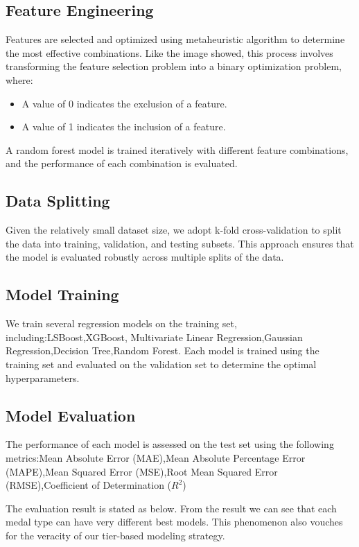 \documentclass{mcmthesis}
\begin{document}
\subsection{Feature Engineering}

Features are selected and optimized using metaheuristic algorithm to determine the most effective combinations. Like the image showed, this process involves transforming the feature selection problem into a binary optimization problem, where:
\begin{itemize}
    \item A value of 0 indicates the exclusion of a feature.
    \item A value of 1 indicates the inclusion of a feature.
\end{itemize}
A random forest model is trained iteratively with different feature combinations, and the performance of each combination is evaluated. 


\subsection{Data Splitting}

Given the relatively small dataset size, we adopt k-fold cross-validation to split the data into training, validation, and testing subsets. This approach ensures that the model is evaluated robustly across multiple splits of the data.

\subsection{Model Training}

We train several regression models on the training set, including:LSBoost,XGBoost,
Multivariate Linear Regression,Gaussian Regression,Decision Tree,Random Forest. Each model is trained using the training set and evaluated on the validation set to determine the optimal hyperparameters.

\subsection{Model Evaluation}

The performance of each model is assessed on the test set using the following metrics:Mean Absolute Error (MAE),Mean Absolute Percentage Error (MAPE),Mean Squared Error (MSE),Root Mean Squared Error (RMSE),Coefficient of Determination ($R^2$)

The evaluation result is stated as below. From the result we can see that each medal type can have very different best models. This phenomenon also vouches for the veracity of our tier-based modeling strategy.
\end{document}
